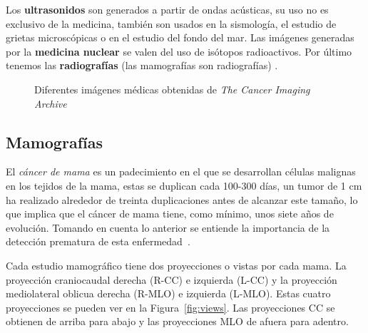 Los \textbf{ultrasonidos} son generados a partir de ondas acústicas, su uso no
es exclusivo de la medicina, también son usados en la sismología, el estudio de
grietas microscópicas o en el estudio del fondo del mar. Las imágenes generadas
por la \textbf{medicina nuclear} se valen del uso de isótopos radioactivos. Por
último tenemos las \textbf{radiografías} (las mamografías son radiografías)
\cite{suetens2009fundamentals}.

\begin{figure}[h]
    \centering

    \hspace{1cm}
    \hspace{1cm}

  \caption[Algunos tipos de imágenes médicas]{Diferentes imágenes médicas
  obtenidas de \textit{The Cancer Imaging Archive}}
  
  \label{medicalimages} \end{figure}

\subsection{Mamografías}

El \textit{cáncer de mama} es un padecimiento en el que se desarrollan células
malignas en los tejidos de la mama, estas se duplican cada 100-300 días, un
tumor de 1 cm ha realizado alrededor de treinta duplicaciones antes de alcanzar
este tamaño, lo que implica que el cáncer de mama tiene, como mínimo, unos
siete años de evolución. Tomando en cuenta lo anterior se entiende la
importancia de la detección prematura de esta enfermedad~\cite{mxcancer}.

Cada estudio mamográfico tiene dos proyecciones o vistas por cada mama. La
proyección craniocaudal derecha (R-CC) e izquierda (L-CC) y la proyección
mediolateral oblicua derecha (R-MLO) e izquierda (L-MLO). Estas cuatro
proyecciones se pueden ver en la Figura~\ref{fig:views}. Las proyecciones CC se
obtienen de arriba para abajo y las proyecciones MLO de afuera para adentro.

